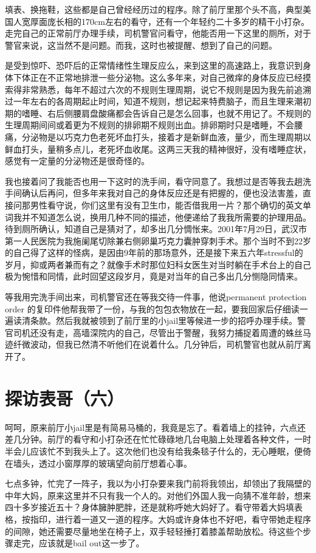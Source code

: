 \documentclass[12pt]{book}
\begin{document}
填表、换拖鞋，这些都是自己曾经经历过的程序。除了前厅里那个头不高，典型美国人宽厚面庞长相的170cm左右的看守，还有一个年轻约二十多岁的精干小打杂。走完自己的正常前厅办理手续，司机警官问看守，他能否用一下这里的厕所，对于警官来说，这当然不是问题。而我，这时也被提醒、想到了自己的问题。

是受到惊吓、恐吓后的正常情绪性生理反应么，来到这里的高速路上，我意识到身体下体正在不正常地排泄一些分泌物。这么多年来，对自己微痒的身体反应已经摸索得非常熟悉，每年不超过六次的不规则生理周期，说它不规则是因为我先前追溯过一年左右的各周期起止时间，知道不规则，想记起来特费脑子，而且生理来潮初期的嗜睡、右后侧腰肩盘酸痛都会告诉自己是怎么回事，也就不用记了。不规则的生理周期间间或着更为不规则的排卵期不规则出血。排卵期时只是嗜睡，不会腰痛，分泌物是以巧克力色老死坏血打头，接着才是新鲜血液，量少，而生理周期以鲜血打头，量稍多点儿，老死坏血收尾。这两三天我的精神很好，没有嗜睡症状，感觉有一定量的分泌物还是很奇怪的。

我也接着问了我能否也用一下这时的洗手间，看守同意了。我想过是否等我去趟洗手间确认后再问，但多年来我对自己的身体反应还是有把握的，便也没法害羞，直接问那男性看守说，你们这里有没有卫生巾，能否借我用一片？那个确切的英文单词我并不知道怎么说，换用几种不同的描述，他便递给了我我所需要的护理用品。待到厕所确认，知道自己是猜对了，却多出几分惆怅来。2001年7月29日，武汉市第一人民医院为我施阑尾切除兼右侧卵巢巧克力囊肿穿刺手术。那个当时不到22岁的自己得了这样的怪病，是因由9年前的那场意外，还是接下来五六年stressful的岁月，抑或两者兼而有之？就像手术时那位妇科女医生对当时躺在手术台上的自己极为惋惜和同情，此时回望这段岁月，竟是对当年的自己多出几分恻隐同情来。

等我用完洗手间出来，司机警官还在等我交待一件事，他说permanent protection order 的复印件他帮我带了一份，与我的包包衣物放在一起，要我回家后仔细读一遍读清条款。然后我就被领到了前厅里的小jail里等候进一步的招呼办理手续。警官司机还没有走，高墙深院内的自己，尽管出于警醒，我努力捕捉着周遭的蛛丝马迹纤微波动，但我已然清不听他们在说着什么。几分钟后，司机警官也就从前厅离开了。
\section{探访表哥（六）}
\label{sec-37-6}
呵呵，原来前厅小jail里是有简易马桶的，我竟是忘了。看着墙上的挂钟，六点还差几分钟。前厅的看守和小打杂还在忙忙碌碌地几台电脑上处理着各种文件，一时半会儿应该忙不到我头上了。这次他们也没有给我条毯子什么的，无心睡眠，便倚在墙头，透过小窗厚厚的玻璃望向前厅想着心事。

七点多钟，忙完了一阵子，我以为小打杂要来我门前将我领出，却领出了我隔壁的中年大妈，原来这里并不只有我一个人的。对他们外国人我一向猜不准年龄，想来四十多岁接近五十？身体臃肿肥胖，还是就称呼她大妈好了。看守带着大妈填表格，按指印，进行着一道又一道的程序。大妈或许身体也不好吧，看守带她走程序的间隙，她还需要尽量地坐在椅子上，双手轻轻捶打着膝盖帮助放松。待这些个步骤走完，应该就是bail out这一步了。
\end{document}
